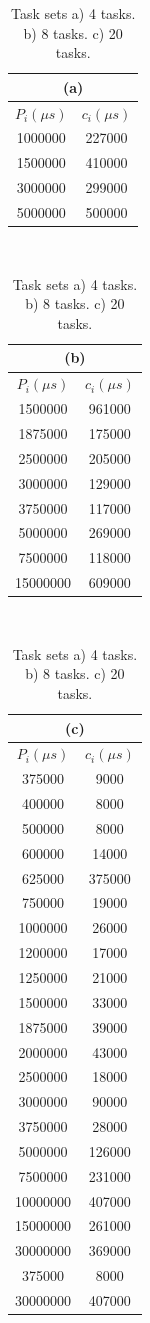 \documentclass[12pt,english]{report}
\providecommand{\tabularnewline}{\\}
\providecommand{\tabularnewline}{\\}
\begin{document}
\begin{flushleft}
\begin{table}[htbp]
\begin{centering}
\caption{\label{pnf_task_sets_table}Task sets \label{tab:Task-sets-a)pnf4}a) 4 tasks. \label{tab:Task-sets-a)pnf8}b)
8 tasks. \label{tab:Task-sets-a)pnf20}c) 20 tasks.}

\begin{tabular}{|c|c|}
\multicolumn{2}{c}{(a)}\tabularnewline
\hline 
$P_{i}(\mu s)$ & $c_{i}(\mu s)$\tabularnewline
\hline 
1000000 & 227000\tabularnewline
\hline 
1500000 & 410000\tabularnewline
\hline 
3000000 & 299000\tabularnewline
\hline 
5000000 & 500000\tabularnewline
\hline 
\end{tabular}~%
\begin{tabular}{|c|c|}
\multicolumn{2}{c}{(b)}\tabularnewline
\hline 
$P_{i}(\mu s)$ & $c_{i}(\mu s)$\tabularnewline
\hline 
1500000 & 961000\tabularnewline
\hline 
1875000 & 175000\tabularnewline
\hline 
2500000 & 205000\tabularnewline
\hline 
3000000 & 129000\tabularnewline
\hline 
3750000 & 117000\tabularnewline
\hline 
5000000 & 269000\tabularnewline
\hline 
7500000 & 118000\tabularnewline
\hline 
15000000 & 609000\tabularnewline
\hline 
\end{tabular}~%
\begin{tabular}{|c|c|}
\multicolumn{2}{c}{(c)}\tabularnewline
\hline 
$P_{i}(\mu s)$ & $c_{i}(\mu s)$\tabularnewline
\hline 
375000 & 9000\tabularnewline
\hline 
400000 & 8000\tabularnewline
\hline 
500000 & 8000\tabularnewline
\hline 
600000 & 14000\tabularnewline
\hline 
625000 & 375000\tabularnewline
\hline 
750000 & 19000\tabularnewline
\hline 
1000000 & 26000\tabularnewline
\hline 
1200000 & 17000\tabularnewline
\hline 
1250000 & 21000\tabularnewline
\hline 
1500000 & 33000\tabularnewline
\hline 
1875000 & 39000\tabularnewline
\hline 
2000000 & 43000\tabularnewline
\hline 
2500000 & 18000\tabularnewline
\hline 
3000000 & 90000\tabularnewline
\hline 
3750000 & 28000\tabularnewline
\hline 
5000000 & 126000\tabularnewline
\hline 
7500000 & 231000\tabularnewline
\hline 
10000000 & 407000\tabularnewline
\hline 
15000000 & 261000\tabularnewline
\hline 
30000000 & 369000\tabularnewline
\hline 
375000 & 8000\tabularnewline
\hline 
30000000 & 407000\tabularnewline
\hline 
\end{tabular}
\par\end{centering}

\end{table}

\par\end{flushleft}
 
\end{document}
